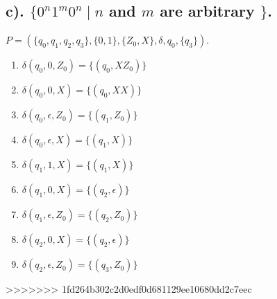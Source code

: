 \documentclass[20pt]{article} %
\begin{document}
\subsection{c). $\{0^{n}1^{m}0^{n} \mid n$ and $m$ are arbitrary $\}$.}
$P = (\{q_0, q_1, q_2, q_3\}, \{0,1\}, \{Z_0, X\}, \delta, q_0, \{q_3\})$.
\begin{enumerate}
\item $\delta(q_0, 0, Z_0) = \{(q_0, XZ_0)\}$
\item $\delta(q_0, 0, X) = \{(q_0, XX)\}$
\item $\delta(q_0, \epsilon, Z_0) = \{(q_1, Z_0)\}$
\item $\delta(q_0, \epsilon, X) = \{(q_1, X)\}$
\item $\delta(q_1, 1, X) = \{(q_1, X)\}$
\item $\delta(q_1, 0, X) = \{(q_2, \epsilon)\}$
\item $\delta(q_1, \epsilon, Z_0) = \{(q_2, Z_0)\}$
\item $\delta(q_2, 0, X) = \{(q_2, \epsilon)\}$
\item $\delta(q_2, \epsilon, Z_0) = \{(q_3, Z_0)\}$
\end{enumerate}
>>>>>>> 1fd264b302c2d0edf0d681129ee10680dd2c7eec
\end{document}
